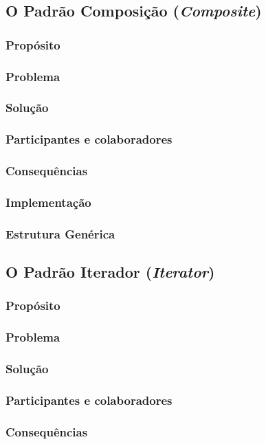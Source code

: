 \documentclass[
	11pt,				%
	openright,
	twoside,			%
	a4paper,			%
	english,			%
	french,
	brazil,				%
	sumario=tradicional
	]{abntex2}
\begin{document}
\subsection{O Padrão Composição (\textit{Composite})}
\subsubsection{Propósito}
\subsubsection{Problema}
\subsubsection{Solução}
\subsubsection{Participantes e colaboradores}
\subsubsection{Consequências}
\subsubsection{Implementação}
\subsubsection{Estrutura Genérica}

\subsection{O Padrão Iterador (\textit{Iterator})}
\subsubsection{Propósito}
\subsubsection{Problema}
\subsubsection{Solução}
\subsubsection{Participantes e colaboradores}
\subsubsection{Consequências}
\end{document}
